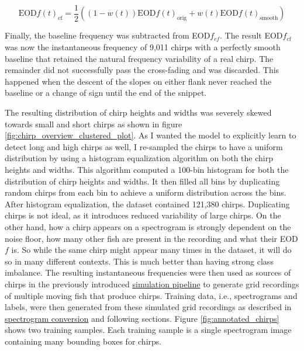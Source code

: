 \begin{equation}
  \text{EOD}f(t)_{\text{cf}} = \frac{1}{2} \left((1 - w(t)) \text{EOD}f(t)_{\text{orig}} + w(t) \text{EOD}f(t)_{\text{smooth}} \right)
\end{equation}

Finally, the baseline frequency was subtracted from EOD$f_{cf}$. The result
EOD$f_{\text{cf}}$ was now the instantaneous frequency of 9,011 chirps with a
perfectly smooth baseline that retained the natural frequency variability of a
real chirp. The remainder did not successfully pass the cross-fading and was
discarded. This happened when the descent of the slopes on either flank never
reached the baseline or a change of sign until the end of the snippet.

The resulting distribution of chirp heights and widths was severely skewed
towards small and short chirps as shown in figure
\ref{fig:chirp_overview_clustered_plot}. As I wanted the model to explicitly
learn to detect long and high chirps as well, I re-sampled the chirps to have a
uniform distribution by using a histogram equalization algorithm on both the
chirp heights and widths. This algorithm computed a 100-bin histogram for both
the distribution of chirp heights and widths. It then filled all bins by
duplicating random chirps from each bin to achieve a uniform distribution
across the bins. After histogram equalization, the dataset contained 121,380
chirps. Duplicating chirps is not ideal, as it introduces reduced variability
of large chirps. On the other hand, how a chirp appears on a spectrogram is
strongly dependent on the noise floor, how many other fish are present in the
recording and what their EOD$f$ is. So while the same chirp might appear many
times in the dataset, it will do so in many different contexts. This is much
better than having strong class imbalance. The resulting instantaneous
frequencies were then used as sources of chirps in the previously introduced
\hyperref[sec:simulatingachirpingfish]{simulation pipeline} to generate grid
recordings of multiple moving fish that produce chirps. Training data, i.e.,
spectrograms and labels, were then generated from these simulated grid
recordings as described in \hyperref[sec:spectrogramconversion]{spectrogram
conversion} and following sections. Figure \ref{fig:annotated_chirps} shows two
training samples. Each training sample is a single spectrogram image containing
many bounding boxes for chirps.

